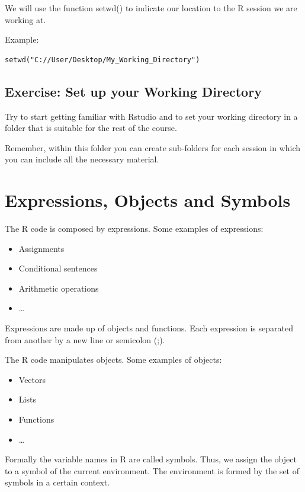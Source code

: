 \documentclass[
]{book}
\providecommand{\tightlist}{%
  \setlength{\itemsep}{0pt}\setlength{\parskip}{0pt}}
\theoremstyle{definition}
\theoremstyle{definition}
\theoremstyle{definition}
\theoremstyle{definition}
\theoremstyle{remark}
\begin{document}
We will use the function setwd() to indicate our location to the R session we are working at.

Example:

\begin{verbatim}
setwd("C://User/Desktop/My_Working_Directory")
\end{verbatim}

\hypertarget{exercise-set-up-your-working-directory}{%
\subsection{Exercise: Set up your Working Directory}\label{exercise-set-up-your-working-directory}}

Try to start getting familiar with Rstudio and to set your working directory in a folder that is suitable for the rest of the course.

Remember, within this folder you can create sub-folders for each session in which you can include all the necessary material.

\hypertarget{expressions-objects-and-symbols}{%
\section{Expressions, Objects and Symbols}\label{expressions-objects-and-symbols}}

The R code is composed by expressions. Some examples of expressions:

\begin{itemize}
\tightlist
\item
  Assignments
\item
  Conditional sentences
\item
  Arithmetic operations
\item
  \ldots{}
\end{itemize}

Expressions are made up of objects and functions. Each expression is separated from another by a new line or semicolon (;).

The R code manipulates objects. Some examples of objects:

\begin{itemize}
\tightlist
\item
  Vectors
\item
  Lists
\item
  Functions
\item
  \ldots{}
\end{itemize}

Formally the variable names in R are called symbols. Thus, we assign the object to a symbol of the current environment. The environment is formed by the set of symbols in a certain context.
\end{document}
